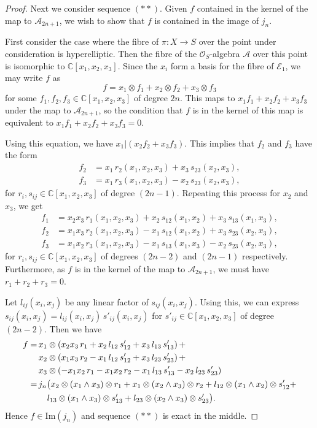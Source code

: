 \documentclass{amsart}
\begin{document}
\begin{proof}
Next we consider sequence $(**)$. Given $f$ contained in the kernel of the map to ${\mathcal{A}}_{2n+1}$, we wish to show that $f$ is contained in the image of $j_n$.

First consider the case where the fibre of $\pi\colon X \to S$ over the point under consideration is hyperelliptic. Then the fibre of the ${\mathcal{O}}_S$-algebra ${\mathcal{A}}$ over this point is isomorphic to  ${\mathbb{C}}[x_1,x_2,x_3]$. Since the $x_i$ form a basis for the fibre of ${\mathcal{E}}_1$, we may write $f$ as 
\[f = x_1 \otimes f_1 + x_2 \otimes f_2 + x_3 \otimes f_3\]
for some $f_1,f_2,f_3 \in {\mathbb{C}}[x_1,x_2,x_3]$ of degree $2n$. This maps to $x_1 f_1 + x_2 f_2 + x_3 f_3$ under the map to ${\mathcal{A}}_{2n+1}$, so the condition that $f$ is in the kernel of this map is equivalent to $x_1 f_1 + x_2 f_2 + x_3 f_3 = 0$.

Using this equation, we have $x_1|(x_2 f_2 + x_3 f_3)$. This implies that $f_2$ and $f_3$ have the form
\begin{align*} f_2 & = x_1 \, r_2(x_1,x_2,x_3) + x_3 \, s_{23}(x_2,x_3),\\
f_3 & = x_1 \, r_3(x_1,x_2,x_3) - x_2 \, s_{23}(x_2,x_3),
\end{align*} 
for $r_i, s_{ij} \in {\mathbb{C}}[x_1,x_2,x_3]$ of degree $(2n-1)$. Repeating this process for $x_2$ and $x_3$, we get
\begin{align*} f_1 & = x_2x_3 \, r_1(x_1,x_2,x_3) + x_2 \, s_{12}(x_1,x_2) + x_3 \, s_{13}(x_1,x_3),\\
f_2 & = x_1x_3 \, r_2(x_1,x_2,x_3) - x_1 \, s_{12}(x_1,x_2) + x_3 \, s_{23}(x_2,x_3), \\
f_3 & = x_1x_2 \, r_3(x_1,x_2,x_3) - x_1 \, s_{13}(x_1,x_3) - x_2 \, s_{23}(x_2,x_3),
\end{align*}
for $r_i, s_{ij} \in {\mathbb{C}}[x_1,x_2,x_3]$ of degrees $(2n-2)$ and $(2n-1)$ respectively. Furthermore, as $f$ is in the kernel of the map to ${\mathcal{A}}_{2n+1}$, we must have $r_1 + r_2 + r_3 = 0$.

Let $l_{ij}(x_i,x_j)$ be any linear factor of $s_{ij}(x_i,x_j)$. Using this, we can express $s_{ij}(x_i,x_j) = l_{ij}(x_i,x_j) \, s'_{ij}(x_i,x_j)$ for $s'_{ij} \in {\mathbb{C}}[x_1,x_2,x_3]$ of degree $(2n-2)$. Then we have
\begin{align*} f = &\, x_1 \otimes (x_2x_3 \, r_1 + x_2 \, l_{12} \, s'_{12} + x_3 \, l_{13} \, s'_{13})\, + \\
&\,  x_2 \otimes (x_1x_3 \, r_2 - x_1 \, l_{12} \, s'_{12} + x_3 \, l_{23} \, s'_{23}) \,+ \\ 
&\, x_3 \otimes (- x_1x_2 \, r_1 - x_1x_2 \, r_2 - x_1 \, l_{13} \, s'_{13} - x_2 \,l_{23} \, s'_{23}) \\
 = &\, j_n\big( x_2 \otimes (x_1 \wedge x_3) \otimes r_1 + x_1 \otimes (x_2 \wedge x_3) \otimes r_2 + l_{12} \otimes (x_1 \wedge x_2) \otimes s'_{12} +\\ 
&\, \makebox[1em]{} l_{13} \otimes (x_1 \wedge x_3) \otimes s'_{13} + l_{23} \otimes (x_2 \wedge x_3) \otimes s'_{23} \big).
\end{align*}
Hence $f \in \mathrm{Im}(j_n)$ and sequence $(**)$ is exact in the middle.


\end{proof}
\end{document}
